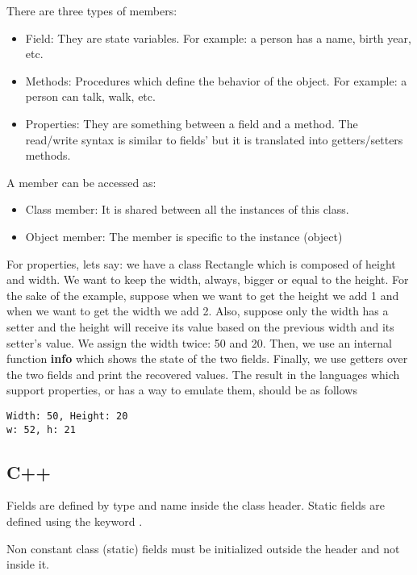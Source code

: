 \documentclass{KodeBook}
\begin{document}
There are three types of members: 
\begin{itemize}
	\item Field: They are state variables. For example: a person has a name, birth year, etc.
	\item Methods: Procedures which define the behavior of the object. For example: a person can talk, walk, etc.
	\item Properties: They are something between a field and a method. The read/write syntax is similar to fields' but it is translated into getters/setters methods.
\end{itemize}

A member can be accessed as: 
\begin{itemize}
	\item Class member: It is shared between all the instances of this class.
	\item Object member: The member is specific to the instance (object)
\end{itemize}

For properties, lets say: we have a class Rectangle which is composed of height and width. 
We want to keep the width, always, bigger or equal to the height.
For the sake of the example, suppose when we want to get the height we add 1 and when we want to get the width we add 2.
Also, suppose only the width has a setter and the height will receive its value based on the previous width and its setter's value.
We assign the width twice: 50 and 20. 
Then, we use an internal function \textbf{info} which shows the state of the two fields. 
Finally, we use getters over the two fields and print the recovered values. 
The result in the languages which support properties, or has a way to emulate them, should be as follows
\begin{lstlisting}[style=shellStyle]
Width: 50, Height: 20
w: 52, h: 21
\end{lstlisting}  

\subsection{C++}

Fields are defined by type and name inside the class header. 
Static fields are defined using the keyword .



Non constant class (static) fields must be initialized outside the header and not inside it. 
\end{document}
